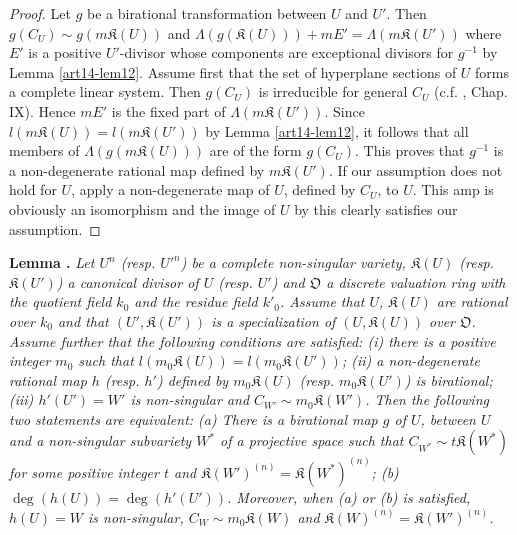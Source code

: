 \begin{proof}
Let $g$ be a birational transformation between $U$ and $U'$. Then $g(C_{U})\sim g(m\mathfrak{K}(U))$ and $\Lambda(g(\mathfrak{K}(U)))+mE'=\Lambda(m\mathfrak{K}(U'))$ where $E'$ is a positive $U'$-divisor whose components are exceptional divisors for $g^{-1}$ by Lemma \ref{art14-lem12}. Assume first that the set of hyperplane sections of $U$ forms a complete linear system. Then $g(C_{U})$ is irreducible for general $C_{U}$ (c.f. \cite{art14-key25}, Chap. IX). Hence $mE'$ is the fixed part of $\Lambda(m\mathfrak{K}(U'))$. Since $l(m\mathfrak{K}(U))=l(m\mathfrak{K}(U'))$ by Lemma \ref{art14-lem12}, it follows that all members of $\Lambda(g(m\mathfrak{K}(U)))$ are of the form $g(C_{U})$. This proves that $g^{-1}$ is a non-degenerate rational map defined by $m\mathfrak{K}(U')$. If our assumption does not hold for $U$, apply a non-degenerate map of $U$, defined by $C_{U}$, to $U$. This amp is obviously an isomorphism and the image of $U$ by this clearly satisfies our assumption.
\end{proof}

\medskip
\noindent
{\bf Lemma .\label{art14-lem14}}
{\em Let $U^{n}$ (resp. ${U'}^{n}$) be a complete non-singular variety, $\mathfrak{K}(U)$ (resp. $\mathfrak{K}(U')$) a canonical divisor of $U$ (resp. $U'$) and $\mathfrak{O}$ a discrete valuation ring with the quotient field $k_{0}$ and the residue field $k'_{0}$. Assume that $U$, $\mathfrak{K}(U)$ are rational over $k_{0}$ and that $(U',\mathfrak{K}(U'))$ is a specialization of $(U,\mathfrak{K}(U))$ over $\mathfrak{O}$. Assume further that the following conditions are satisfied: {\rm(i)} there is a positive integer $m_{0}$ such that $l(m_{0}\mathfrak{K}(U))=l(m_{0}\mathfrak{K}(U'))$; {\rm(ii)} a non-degenerate rational map $h$ (resp. $h'$) defined by $m_{0}\mathfrak{K}(U)$ (resp. $m_{0}\mathfrak{K}(U')$) is birational; {\rm(iii)} $h'(U')=W'$ is non-singular and $C_{W'}\sim m_{0}\mathfrak{K}(W')$. Then the following two statements are equivalent: {\rm(a)} There is a birational map $g$ of $U$, between $U$ and a non-singular subvariety $W^{*}$ of a projective space such that $C_{W^{*}}\sim t\mathfrak{K}(W^{*})$ for some positive integer $t$ and $\mathfrak{K}(W')^{(n)}=\mathfrak{K}(W^{*})^{(n)}$; {\rm(b)} $\deg(h(U))=\deg (h'(U'))$. Moreover, when {\rm(a)} or {\rm(b)} is satisfied, $h(U)=W$ is non-singular, $C_{W}\sim m_{0}\mathfrak{K}(W)$ and $\mathfrak{K}(W)^{(n)}=\mathfrak{K}(W')^{(n)}$.}

